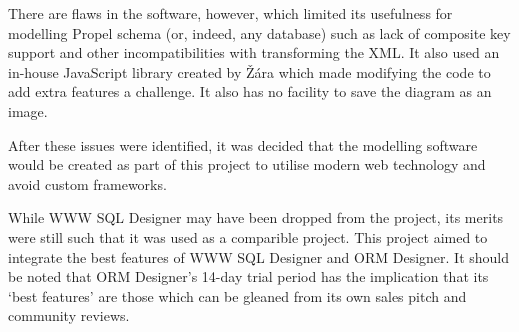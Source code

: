 There are flaws in the software, however, which limited its usefulness for modelling Propel schema (or, indeed, any database) such as lack of composite key support and other incompatibilities with transforming the XML. It also used an in-house JavaScript library created by \v{Z}\'{a}ra which made modifying the code to add extra features a challenge. It also has no facility to save the diagram as an image.

After these issues were identified, it was decided that the modelling software would be created as part of this project to utilise modern web technology and avoid custom frameworks.

While WWW SQL Designer may have been dropped from the project, its merits were still such that it was used as a comparible project. This project aimed to integrate the best features of WWW SQL Designer and ORM Designer. It should be noted that ORM Designer's 14-day trial period has the implication that its `best features' are those which can be gleaned from its own sales pitch and community reviews.